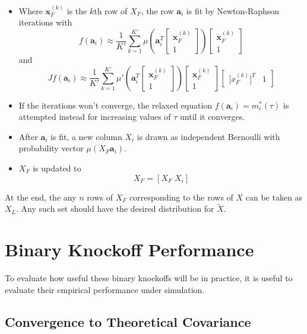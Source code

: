 \documentclass[11pt]{article}
\theoremstyle{definition}
\begin{document}
         \begin{itemize}
             \item Where $\mathbf x_F^{(k)}$ is the $k$th row of $X_F$, the row $\mathbf a_i$ is fit by Newton-Raphson iterations with 
             \[f\left(\mathbf a_i\right) \approx \frac{1}{K'}\sum_{k=1}^{K'} \mu\left(\mathbf{a}_i^T\left[\begin{array}{c} \mathbf x_F^{(k)} \\ 1 \end{array}\right]\right)\left[\begin{array}{c} \mathbf x_F^{(k)} \\ 1 \end{array}\right] \]
             and
             \[J f\left(\mathbf a_i\right) \approx \frac{1}{K'}\sum_{k=1}^{K'} \mu'\left(\mathbf{a}_i^T\left[\begin{array}{c} \mathbf x_F^{(k)} \\ 1 \end{array}\right]\right)\left[\begin{array}{c} \mathbf x_F^{(k)} \\ 1 \end{array}\right]\left[\begin{array}{cc} \mathbf [x_F^{(k)}]^T & 1 \end{array}\right] \]
             \item If the iterations won't converge, the relaxed equation $f(\mathbf a_i)=m_i^*(\tau)$ is attempted instead for increasing values of $\tau$ until it converges.
             \item After $\mathbf a_i$ is fit, a new column $X_i$ is drawn as independent Bernoulli with probability vector $\mu(X_F \mathbf a_i)$.   
             \item $X_F$ is updated to 
             \[ X_F = [X_F \; X_i] \]
         \end{itemize}
         At the end, the any $n$ rows of $X_F$ corresponding to the rows of $X$ can be taken as $X_L$. Any such set should have the desired distribution for $\tilde X$.

\section{Binary Knockoff Performance}
    To evaluate how useful these binary knockoffs will be in practice, it is useful to evaluate their empirical performance under simulation. 

\subsection{Convergence to Theoretical Covariance} 
\end{document}
